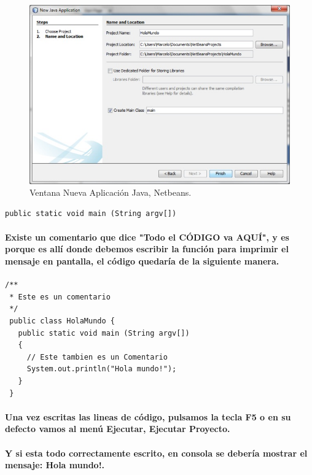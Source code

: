 \documentclass[12pt]{book} %
\begin{document}
	\begin{figure}[h]
		\centering
			\includegraphics[width=12cm]{Hola_mundo_003.jpg}
			\caption{Ventana Nueva Aplicaci\'on Java, Netbeans.}
		
	\end{figure}


\noindent
\begin{lstlisting}[frame=single]
   public static void main (String argv[])
\end{lstlisting}

\paragraph{Existe un comentario que dice "Todo el CÓDIGO va AQUÍ", y es porque es allí donde debemos escribir la función para imprimir el mensaje en pantalla, el código quedaría de la siguiente manera.}

\noindent
%
\begin{lstlisting}[frame=single]
/**
 * Este es un comentario
 */
 public class HolaMundo {
   public static void main (String argv[])
   {
     // Este tambien es un Comentario
     System.out.println("Hola mundo!");
   }
 }
\end{lstlisting}

\paragraph{Una vez escritas las lineas de código, pulsamos la tecla F5 o en su defecto vamos al menú Ejecutar, Ejecutar Proyecto.}

\paragraph{Y si esta todo correctamente escrito, en consola se debería mostrar el mensaje: Hola mundo!.}
\end{document}
